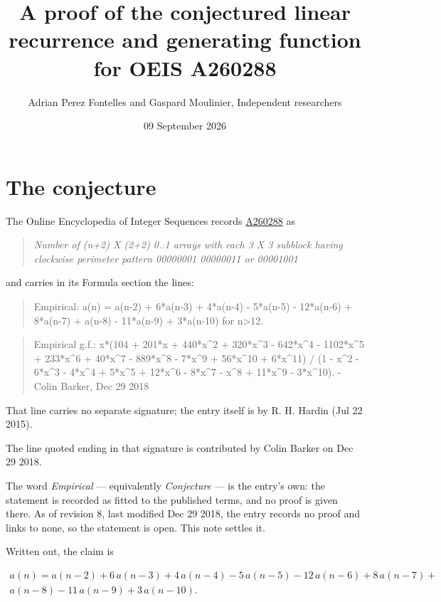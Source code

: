 \documentclass[11pt]{article}
\title{A proof of the conjectured linear recurrence and generating function for OEIS A260288}
\author{Adrian Perez Fontelles and Gaspard Moulinier, Independent researchers}
\date{09 September 2026}
\theoremstyle{definition}
\begin{document}
\maketitle
\section{The conjecture}

The Online Encyclopedia of Integer Sequences records \href{https://oeis.org/A260288}{A260288} as

\begin{quote}\itshape Number of (n+2) X (2+2) 0..1 arrays with each 3 X 3 subblock having clockwise perimeter pattern 00000001 00000011 or 00001001\end{quote}

and carries in its Formula section the lines:

\begin{quote}\ttfamily Empirical: a(n) = a(n-2) + 6*a(n-3) + 4*a(n-4) - 5*a(n-5) - 12*a(n-6) + 8*a(n-7) + a(n-8) - 11*a(n-9) + 3*a(n-10) for n>12.\end{quote}

\begin{quote}\ttfamily Empirical g.f.: x*(104 + 201*x + 440*x\textasciicircum{}2 + 320*x\textasciicircum{}3 - 642*x\textasciicircum{}4 - 1102*x\textasciicircum{}5 + 233*x\textasciicircum{}6 + 40*x\textasciicircum{}7 - 889*x\textasciicircum{}8 - 7*x\textasciicircum{}9 + 56*x\textasciicircum{}10 + 6*x\textasciicircum{}11) / (1 - x\textasciicircum{}2 - 6*x\textasciicircum{}3 - 4*x\textasciicircum{}4 + 5*x\textasciicircum{}5 + 12*x\textasciicircum{}6 - 8*x\textasciicircum{}7 - x\textasciicircum{}8 + 11*x\textasciicircum{}9 - 3*x\textasciicircum{}10). - Colin Barker, Dec 29 2018\end{quote}

That line carries no separate signature; the entry itself is by R. H. Hardin (Jul 22 2015).

The line quoted ending in that signature is contributed by Colin Barker on Dec 29 2018.

The word {\itshape Empirical} --- equivalently {\itshape Conjecture} --- is the entry's own: the statement is recorded as fitted to the published terms, and no proof is given there. As of revision 8, last modified Dec 29 2018, the entry records no proof and links to none, so the statement is open. This note settles it.

Written out, the claim is

\begin{multline*} a(n) = a(n-2) + 6\,a(n-3) + 4\,a(n-4) - 5\,a(n-5) - 12\,a(n-6) + 8\,a(n-7) + \\ a(n-8) - 11\,a(n-9) + 3\,a(n-10). \end{multline*}
\end{document}
